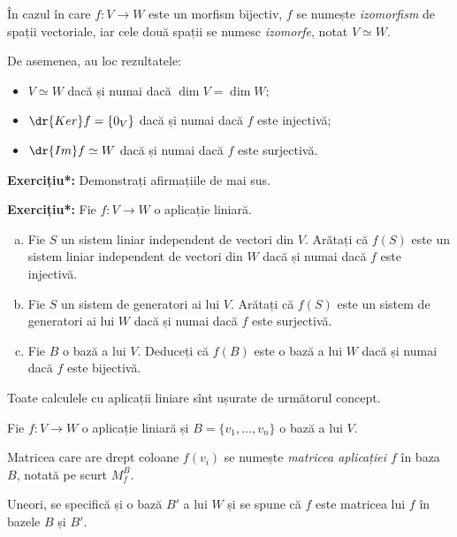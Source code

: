 În cazul în care $ f : V \to W $ este un morfism bijectiv, $ f $ se numește
\emph{izomorfism} de spații vectoriale, iar cele două spații se numesc \emph{izomorfe},
notat $ V \simeq W $.

De asemenea, au loc rezultatele:
\begin{itemize}
    \item $ V \simeq W $ dacă și numai dacă $ \dim V = \dim W $;
    \item $ \dr{Ker}f = \{ 0_V \} $ dacă și numai dacă $ f $ este injectivă;
    \item $ \dr{Im}f \simeq W $ dacă și numai dacă $ f $ este surjectivă.
\end{itemize}

\textbf{Exercițiu*:} Demonstrați afirmațiile de mai sus.

\vspace{1cm}

\textbf{Exercițiu*:} Fie $ f : V \to W $ o aplicație liniară.
\begin{enumerate}[(a)]
    \item Fie $ S $ un sistem liniar independent de vectori din $ V $.
        Arătați că $ f(S) $ este un sistem liniar independent de vectori din $ W $
        dacă și numai dacă $ f $ este injectivă.
    \item Fie $ S $ un sistem de generatori ai lui $ V $. Arătați că $ f(S) $ este
        un sistem de generatori ai lui $ W $ dacă și numai dacă $ f $ este surjectivă.
    \item Fie $ B $ o bază a lui $ V $. Deduceți că $ f(B) $ este o bază a lui $ W $ 
        dacă și numai dacă $ f $ este bijectivă.
\end{enumerate}

\vspace{1cm}

Toate calculele cu aplicații liniare sînt ușurate de următorul concept.

\begin{definition}\label{def:mat-apl}
    Fie $ f : V \to W $ o aplicație liniară și $ B = \{ v_1, \dots, v_n \} $ o bază a lui $ V $.

    Matricea care are drept coloane $ f(v_i) $ se numește \emph{matricea aplicației $ f $}
    în baza $ B $, notată pe scurt $ M_f^B $.

    Uneori, se specifică și o bază $ B' $ a lui $ W $ și se spune că $ f $ este matricea
    lui $ f $ în bazele $ B $ și $ B' $.
\end{definition}

